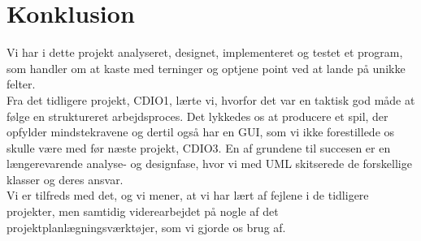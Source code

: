 \chapter{Konklusion}
Vi har i dette projekt analyseret, designet, implementeret og testet et program, som handler om at kaste med terninger og optjene point ved at lande på unikke felter.
\\
Fra det tidligere projekt, CDIO1, lærte vi, hvorfor det var en taktisk god måde at følge en struktureret arbejdsproces.
Det lykkedes os at producere et spil, der opfylder mindstekravene og dertil også har en GUI, som vi ikke forestillede os skulle være med før næste projekt, CDIO3.
En af grundene til succesen er en længerevarende analyse- og designfase, hvor vi med UML skitserede de forskellige klasser og deres ansvar.
\\
Vi er tilfreds med det, og vi mener, at vi har lært af fejlene i de tidligere projekter, men samtidig viderearbejdet på nogle af det projektplanlægningsværktøjer, som vi gjorde os brug af.